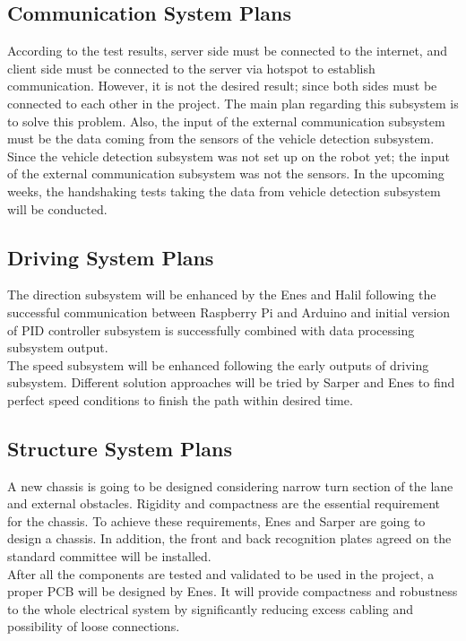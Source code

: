 \documentclass[a4paper,12pt]{article}
\begin{document}
	
	\subsection{Communication System Plans}
		According to the test results, server side must be connected to the internet, and client side must be connected to the server via hotspot to establish communication. However, it is not the desired result; since both sides must be connected to each other in the project. The main plan regarding this subsystem is to solve this problem. Also, the input of the external communication subsystem must be the data coming from the sensors of the vehicle detection subsystem. Since the vehicle detection subsystem was not set up on the robot yet; the input of the external communication subsystem was not the sensors. In the upcoming weeks, the handshaking tests taking the data from vehicle detection subsystem will be conducted.
	\subsection{Driving System Plans}
		The direction subsystem will be enhanced by the Enes and Halil following the successful communication between Raspberry Pi and Arduino and initial version of PID controller subsystem is successfully combined with data processing subsystem output. \\
		
		The speed subsystem will be enhanced following the early outputs of driving subsystem. Different solution approaches will be tried by Sarper and Enes to find perfect speed conditions to finish the path within desired time.
	
	\subsection{Structure System Plans}
	
	A new chassis is going to be designed considering narrow turn section of the lane and  external obstacles. Rigidity and compactness are  the essential requirement for the chassis. To achieve these requirements, Enes and Sarper are going to design a chassis. In addition, the front and back recognition plates agreed on the standard committee will be installed.\\
	
	After all the components are tested and validated to be used in the project, a proper PCB will be designed by Enes. It will provide compactness and robustness to the whole electrical system by significantly reducing excess cabling and possibility of loose connections.
	
\end{document}
